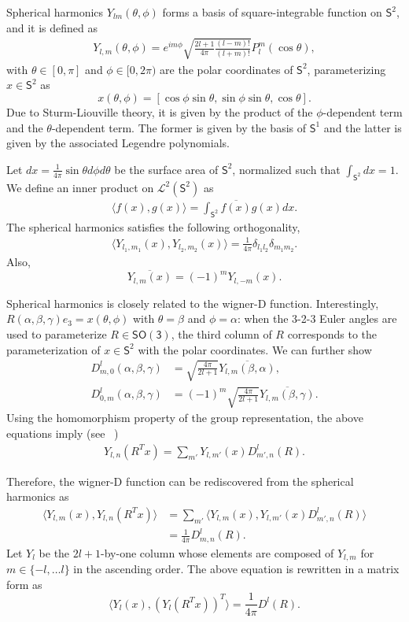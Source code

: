 \documentclass[onecolumn,11pt]{IEEEtran}
\newcommand{\pair}[1]{\ensuremath{\langle #1 \rangle}}
\newcommand{\SO}{\ensuremath{\mathsf{SO(3)}}}
\newcommand{\Sph}{\ensuremath{\mathsf{S}}}
\begin{document}
Spherical harmonics $Y_{lm}(\theta,\phi)$ forms a basis of square-integrable function on $\Sph^2$, and it is defined as
\begin{align}
    Y_{l,m}(\theta,\phi) = e^{im\phi} \sqrt{\frac{2l+1}{4\pi}\frac{(l-m)!}{(l+m)!}}  P^m_l(\cos\theta),
\end{align}
with $\theta\in[0,\pi]$ and $\phi\in[0,2\pi)$ are the polar coordinates of $\Sph^2$, parameterizing $x\in\Sph^2$ as 
\[
    x(\theta,\phi)=[\cos\phi\sin\theta, \sin\phi\sin\theta, \cos\theta]. 
\]
Due to Sturm-Liouville theory, it is given by the product of the $\phi$-dependent term and the $\theta$-dependent term. 
The former is given by the basis of $\Sph^1$ and the latter is given by the associated Legendre polynomials. 

Let $dx=\frac{1}{4\pi} \sin\theta d\phi d\theta$ be the surface area of $\Sph^2$, normalized such that $\int_{\Sph^2} dx =1$. 
We define an inner product on $\mathcal{L}^2(\Sph^2)$ as
\begin{align*}
    \pair{ f(x), g(x) } = \int_{\Sph^2} \overline{f(x)}g(x) dx.
\end{align*}
The spherical harmonics satisfies the following orthogonality,
\begin{align*}
    \pair{ Y_{l_1,m_1}(x), Y_{l_2,m_2}(x)} = \frac{1}{4\pi} \delta_{l_1l_2} \delta_{m_1m_2}.
\end{align*}
Also,
\[
    \overline{Y_{l,m}(x)} = (-1)^m Y_{l,-m}(x).
\]

Spherical harmonics is closely related to the wigner-D function. 
Interestingly, $R(\alpha,\beta,\gamma)e_3=x(\theta,\phi)$ with $\theta=\beta$ and $\phi=\alpha$: when the 3-2-3 Euler angles are used to parameterize $R\in\SO$, the third column of $R$ corresponds to the parameterization of $x\in\Sph^2$ with the polar coordinates.  
We can further show
\begin{align*}
    D^l_{m,0}(\alpha,\beta,\gamma) &= \sqrt{\frac{4\pi}{2l+1}}\overline{Y_{l,m}(\beta,\alpha)},\\
    D^l_{0,m}(\alpha,\beta,\gamma) &= (-1)^m\sqrt{\frac{4\pi}{2l+1}}\overline{Y_{l,m}(\beta,\gamma)}.
\end{align*}
Using the homomorphism property of the group representation, the above equations imply (see ~\cite[pp. 342]{ChiKya01})
\begin{align*}
    Y_{l,n}(R^T x) = \sum_{m'} Y_{l,m'}(x) D^l_{m',n}(R) .
\end{align*}

Therefore, the wigner-D function can be rediscovered from the spherical harmonics as
\begin{align*}
    \pair{Y_{l,m}(x), Y_{l,n}(R^T x) } &= \sum_{m'} \pair{Y_{l,m}(x), Y_{l,m'}(x) D^l_{m',n}(R) }\\
    & = \frac{1}{4\pi} D^l_{m,n}(R).
\end{align*}
Let $Y_l$ be the $2l+1$-by-one column whose elements are composed of $Y_{l,m}$ for $m\in\{-l,\ldots l\}$ in the ascending order. 
The above equation is rewritten in a matrix form as
\[
    \pair{ Y_l(x), (Y_l(R^Tx))^T } = \frac{1}{4\pi} D^l(R).
\]
\end{document}
